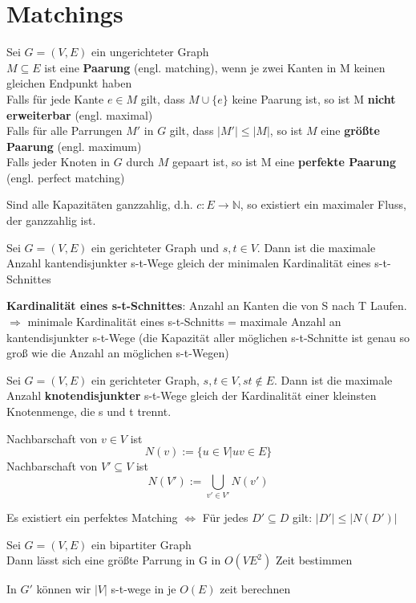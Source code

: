 \documentclass[14pt]{article}
\begin{document}
\section{Matchings}
\begin{definition}[Matchings]
    Sei $G = (V, E)$ ein ungerichteter Graph \\
    $M \subseteq E$ ist eine \textbf{Paarung} (engl. matching), wenn je zwei 
    Kanten in M keinen gleichen Endpunkt haben \\
    Falls für jede Kante $e \in M$ gilt, dass $M \cup \{ e \}$ keine 
    Paarung ist, so ist M \textbf{nicht erweiterbar} (engl. maximal) \\
    Falls für alle Parrungen $M'$ in $G$ gilt, dass $|M'| \leq |M|$,
    so ist $M$ eine \textbf{größte Paarung} (engl. maximum) \\
    Falls jeder Knoten in $G$ durch $M$ gepaart ist, so ist M eine 
    \textbf{perfekte Paarung} (engl. perfect matching)
\end{definition}
\begin{definition}[Ganzzahligkeitssatz]
    Sind alle Kapazitäten ganzzahlig, d.h. $c: E \rightarrow \mathbb{N}$, 
    so existiert ein maximaler Fluss, der ganzzahlig ist.
\end{definition}
\begin{eigenschaft}
    Sei $G = (V, E)$ ein gerichteter Graph und $s, t \in V$. Dann ist 
    die maximale Anzahl kantendisjunkter s-t-Wege gleich der minimalen
    Kardinalität eines s-t-Schnittes
\end{eigenschaft}
\textbf{Kardinalität eines s-t-Schnittes}: Anzahl an Kanten die von 
S nach T Laufen. \\
$\Rightarrow$ minimale Kardinalität eines s-t-Schnitts = maximale 
Anzahl an kantendisjunkter s-t-Wege (die Kapazität aller möglichen
s-t-Schnitte ist genau so groß wie die Anzahl an möglichen s-t-Wegen)
\begin{eigenschaft}
    Sei $G = (V, E)$ ein gerichteter Graph, $s, t \in V, st \notin E$.
    Dann ist die maximale Anzahl \textbf{knotendisjunkter} s-t-Wege gleich
    der Kardinalität einer kleinsten Knotenmenge, die s und t trennt.
\end{eigenschaft}
\begin{definition}[Nachbarschaft]
    Nachbarschaft von $v \in V$ ist \\
    \[
        N(v) := \{ u \in V | uv \in E\}  
    \]
    Nachbarschaft von $V' \subseteq V$ ist
    \[
        N(V') := \bigcup_{v' \in V'} N(v')
    \]
\end{definition}
\begin{definition}
    Es existiert ein perfektes Matching $\Leftrightarrow$ Für jedes 
    $D' \subseteq D$ gilt: $|D'| \leq |N(D')|$
\end{definition}
\begin{eigenschaft}
    Sei $G = (V, E)$ ein bipartiter Graph \\
    Dann lässt sich eine größte Parrung in G in $O(VE^2)$ Zeit bestimmen
\end{eigenschaft}
In $G'$ können wir $|V|$ s-t-wege in je $O(E)$ zeit berechnen
\end{document}
